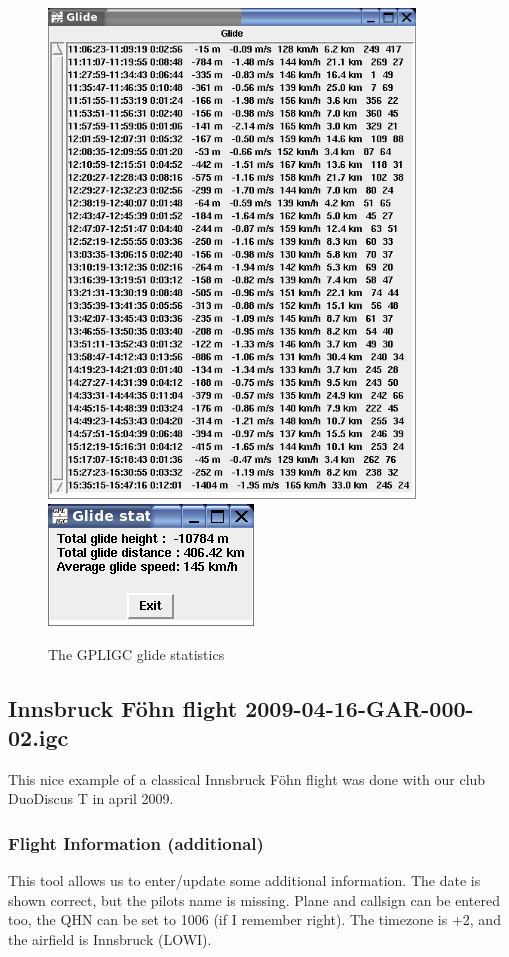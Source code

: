 \begin{figure}[h]
\caption{\label{glide}The GPLIGC glide statistics}
\begin{center}
\includegraphics[height=13cm]{png/glidestat1}
\includegraphics{png/glidestat2}
\end{center}
\end{figure}


\clearpage


\subsection{Innsbruck F\"ohn flight 2009-04-16-GAR-000-02.igc}

This nice example of a classical Innsbruck F\"ohn flight was done with our club DuoDiscus T in april 2009.

\subsubsection{Flight Information (additional)}
This tool allows us to enter/update some additional information. The date is shown correct, but the pilots name is missing.
Plane and callsign can be entered too, the QHN can be set to 1006 (if I remember right). The timezone is +2, and the airfield is Innsbruck (LOWI).

